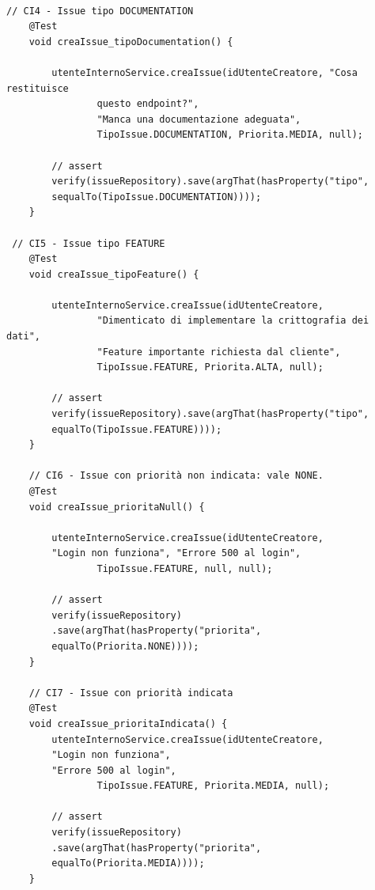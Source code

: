 \begin{listing}[!ht]
\begin{verbatim}

// CI4 - Issue tipo DOCUMENTATION
    @Test
    void creaIssue_tipoDocumentation() {

        utenteInternoService.creaIssue(idUtenteCreatore, "Cosa restituisce 
                questo endpoint?",
                "Manca una documentazione adeguata",
                TipoIssue.DOCUMENTATION, Priorita.MEDIA, null);

        // assert
        verify(issueRepository).save(argThat(hasProperty("tipo", 
        sequalTo(TipoIssue.DOCUMENTATION))));
    }

 // CI5 - Issue tipo FEATURE
    @Test
    void creaIssue_tipoFeature() {

        utenteInternoService.creaIssue(idUtenteCreatore, 
                "Dimenticato di implementare la crittografia dei dati",
                "Feature importante richiesta dal cliente",
                TipoIssue.FEATURE, Priorita.ALTA, null);

        // assert
        verify(issueRepository).save(argThat(hasProperty("tipo", 
        equalTo(TipoIssue.FEATURE))));
    }

    // CI6 - Issue con priorità non indicata: vale NONE.
    @Test
    void creaIssue_prioritaNull() {

        utenteInternoService.creaIssue(idUtenteCreatore, 
        "Login non funziona", "Errore 500 al login",
                TipoIssue.FEATURE, null, null);

        // assert
        verify(issueRepository)
        .save(argThat(hasProperty("priorita", 
        equalTo(Priorita.NONE))));
    }

    // CI7 - Issue con priorità indicata
    @Test
    void creaIssue_prioritaIndicata() {
        utenteInternoService.creaIssue(idUtenteCreatore, 
        "Login non funziona", 
        "Errore 500 al login",
                TipoIssue.FEATURE, Priorita.MEDIA, null);

        // assert
        verify(issueRepository)
        .save(argThat(hasProperty("priorita", 
        equalTo(Priorita.MEDIA))));
    }
   
\end{verbatim}
\end{listing}

\clearpage

